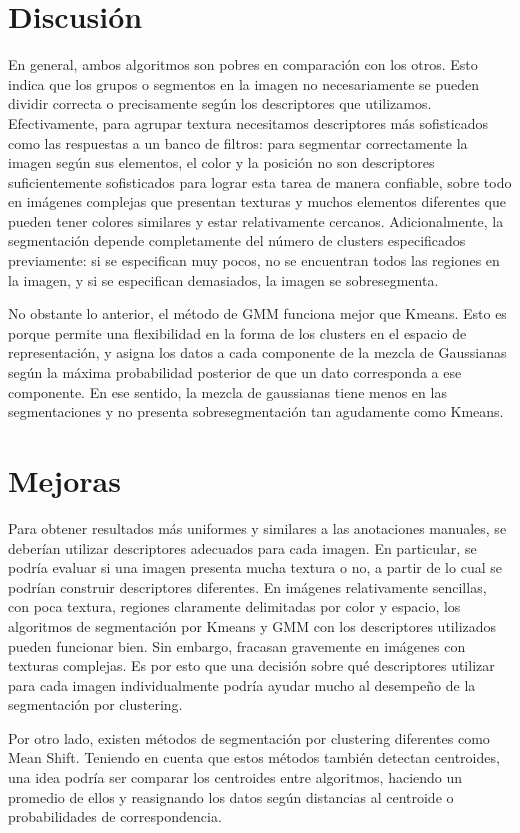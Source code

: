 \documentclass[10pt,twocolumn,letterpaper]{article}
\begin{document}
\section{Discusión}
En general, ambos algoritmos son pobres en comparación con los otros. Esto indica que los grupos o segmentos en la imagen no necesariamente se pueden dividir correcta o precisamente según los descriptores que utilizamos. Efectivamente, para agrupar textura necesitamos descriptores más sofisticados como las respuestas a un banco de filtros: para segmentar correctamente la imagen según sus elementos, el color y la posición no son descriptores suficientemente sofisticados para lograr esta tarea de manera confiable, sobre todo en imágenes complejas que presentan texturas y muchos elementos diferentes que pueden tener colores similares y estar relativamente cercanos.
Adicionalmente, la segmentación depende completamente del número de clusters especificados previamente: si se especifican muy pocos, no se encuentran todos las regiones en la imagen, y si se especifican demasiados, la imagen se sobresegmenta. 

No obstante lo anterior, el método de GMM funciona mejor que Kmeans. Esto es porque permite una flexibilidad en la forma de los clusters en el espacio de representación, y asigna los datos a cada componente de la mezcla de Gaussianas según la máxima probabilidad posterior de que un dato corresponda a ese componente. En ese sentido, la mezcla de gaussianas tiene menos  en las segmentaciones y no presenta sobresegmentación tan agudamente como Kmeans. 

\section{Mejoras}

Para obtener resultados más uniformes y similares a las anotaciones manuales, se deberían utilizar descriptores adecuados para cada imagen. En particular, se podría evaluar si una imagen presenta mucha textura o no, a partir de lo cual se podrían construir descriptores diferentes. En imágenes relativamente sencillas, con poca textura, regiones claramente delimitadas por color y espacio, los algoritmos de segmentación por Kmeans y GMM con los descriptores utilizados pueden funcionar bien. Sin embargo, fracasan gravemente en imágenes con texturas complejas. Es por esto que una decisión sobre qué descriptores utilizar para cada imagen individualmente podría ayudar mucho al desempeño de la segmentación por clustering. 

Por otro lado, existen métodos de segmentación por clustering diferentes como Mean Shift. Teniendo en cuenta que estos métodos también detectan centroides, una idea podría ser comparar los centroides entre algoritmos, haciendo un promedio de ellos y reasignando los datos según distancias al centroide o probabilidades de correspondencia. 


{\small


}
\end{document}
